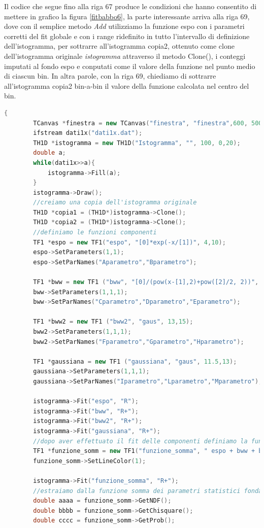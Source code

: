 \documentclass[11pt,fleqn]{book} %
\begin{document}
Il codice che segue fino alla riga 67 produce le condizioni che hanno consentito di mettere in grafico la figura \ref{fitbabbo6}, la parte interessante arriva alla riga 69, dove con il semplice metodo \textit{Add} utilizziamo la funzione espo con i parametri corretti del fit globale e con i range ridefinito in tutto l'intervallo di definizione dell'istogramma, per sottrarre all'istogramma copia2, ottenuto come clone dell'istogramma originale  \textit{istogramma} attraverso il metodo Clone(), i conteggi imputati al fondo espo e conputati come il valore della funzione nel punto medio di ciascun bin. In altra parole, con la riga 69, chiediamo di sottrarre all'istogramma copia2 bin-a-bin il valore della funzione calcolata nel centro del bin.
\begin{lstlisting}[language=c++]
{
		TCanvas *finestra = new TCanvas("finestra", "finestra",600, 500);
		ifstream dati1x("dati1x.dat");
		TH1D *istogramma = new TH1D("Istogramma", "", 100, 0,20);
		double a;
		while(dati1x>>a){
			istogramma->Fill(a);
		}
		istogramma->Draw();
		//creiamo una copia dell'istogramma originale
		TH1D *copia1 = (TH1D*)istogramma->Clone();
        TH1D *copia2 = (TH1D*)istogramma->Clone();
        //definiamo le funzioni componenti
		TF1 *espo = new TF1("espo", "[0]*exp(-x/[1])", 4,10);
		espo->SetParameters(1,1);
		espo->SetParNames("Aparametro","Bparametro");

		TF1 *bww = new TF1 ("bww", "[0]/(pow(x-[1],2)+pow([2]/2, 2))", 1,3.5);
		bww->SetParameters(1,1,1);
		bww->SetParNames("Cparametro","Dparametro","Eparametro");

		TF1 *bww2 = new TF1 ("bww2", "gaus", 13,15);
		bww2->SetParameters(1,1,1);
		bww2->SetParNames("Fparametro","Gparametro","Hparametro");

		TF1 *gaussiana = new TF1 ("gaussiana", "gaus", 11.5,13);
		gaussiana->SetParameters(1,1,1);
		gaussiana->SetParNames("Iparametro","Lparametro","Mparametro");

		istogramma->Fit("espo", "R");
		istogramma->Fit("bww", "R+");
		istogramma->Fit("bww2", "R+");
		istogramma->Fit("gaussiana", "R+");
        //dopo aver effettuato il fit delle componenti definiamo la funzione somma
		TF1 *funzione_somm = new TF1("funzione_somma", " espo + bww + bww2 + gaussiana", 0, 20);
		funzione_somm->SetLineColor(1);

		istogramma->Fit("funzione_somma", "R+");
        //estraiamo dalla funzione somma dei parametri statistici fondamentali
		double aaaa = funzione_somm->GetNDF();
		double bbbb = funzione_somm->GetChisquare();
		double cccc = funzione_somm->GetProb();


\end{lstlisting}
\end{document}
